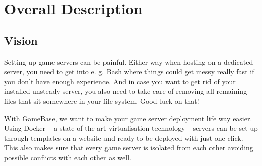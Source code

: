 \documentclass[a4paper,12pt,chapterprefix=false,bibliography=totoc,listof=totoc,]{scrreprt}
\begin{document}
\chapter{Overall Description}
\section{Vision}
Setting up game servers can be painful. Either way when hosting on a dedicated server, you need to get into e. g. Bash where things could get messy really fast if you don't have enough experience. And in case you want to get rid of your installed unsteady server, you also need to take care of removing all remaining files that sit somewhere in your file system. Good luck on that!

With GameBase, we want to make your game server deployment life way easier. Using Docker – a state-of-the-art virtualisation technology – servers can be set up through templates on a website and ready to be deployed with just one click. This also makes sure that every game server is isolated from each other avoiding possible conflicts with each other as well.
\end{document}
